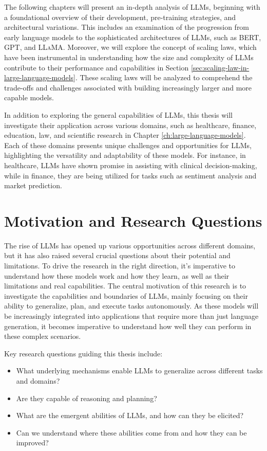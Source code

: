 The following chapters will present an in-depth analysis of LLMs, beginning with a foundational overview of their development, pre-training strategies, and architectural variations.
This includes an examination of the progression from early language models to the sophisticated architectures of LLMs, such as BERT, GPT, and \textsc{LLaMA}.
Moreover, we will explore the concept of scaling laws, which have been instrumental in understanding how the size and complexity of LLMs contribute to their performance and capabilities in Section \ref{sec:scaling-law-in-large-language-models}.
These scaling laws will be analyzed to comprehend the trade-offs and challenges associated with building increasingly larger and more capable models.

In addition to exploring the general capabilities of LLMs, this thesis will investigate their application across various domains, such as healthcare, finance, education, law, and scientific research in Chapter \ref{ch:large-language-models}.
Each of these domains presents unique challenges and opportunities for LLMs, highlighting the versatility and adaptability of these models.
For instance, in healthcare, LLMs have shown promise in assisting with clinical decision-making, while in finance, they are being utilized for tasks such as sentiment analysis and market prediction.


\section*{Motivation and Research Questions}
The rise of LLMs has opened up various opportunities across different domains, but it has also raised several crucial questions about their potential and limitations.
To drive the research in the right direction, it's imperative to understand how these models work and how they learn, as well as their limitations and real capabilities.
The central motivation of this research is to investigate the capabilities and boundaries of LLMs, mainly focusing on their ability to generalize, plan, and execute tasks autonomously.
As these models will be increasingly integrated into applications that require more than just language generation, it becomes imperative to understand how well they can perform in these complex scenarios.

\noindent Key research questions guiding this thesis include:

\begin{itemize}
	\item What underlying mechanisms enable LLMs to generalize across different tasks and domains?
	\item Are they capable of reasoning and planning?
	\item What are the emergent abilities of LLMs, and how can they be elicited?
	\item Can we understand where these abilities come from and how they can be improved?
\end{itemize}

